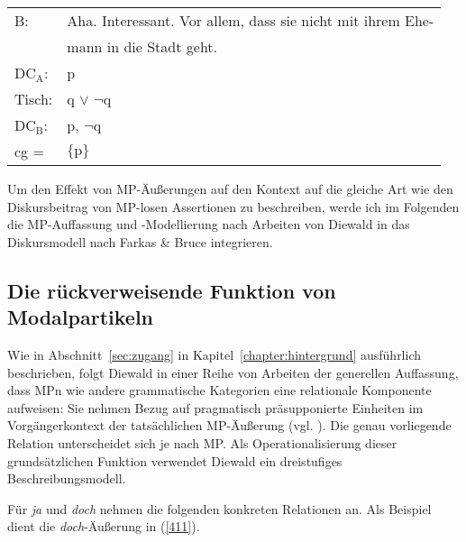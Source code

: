 \begin{exe}
	\ex\label{410}
     \begin{tabular}[t]{lp{20em}}
     		B: & Aha. Interessant. Vor allem, dass sie nicht mit ihrem Ehe-\\
     		& mann in die Stadt geht.\\
            DC$_{\textrm{A}}$: & p\\
            Tisch: & q $\vee$ $\neg$q\\
 			DC$_{\textrm{B}}$: & p, $\neg$q\\
 			cg = & $\lbrace \textrm{p} \rbrace$
      \end{tabular}
\end{exe}	
Um den Effekt von MP-Äußerungen auf den Kontext auf die gleiche Art wie den Diskursbeitrag von MP-losen Assertionen zu be\-schreiben, werde ich im Folgenden die MP-Auffassung und -Modellierung nach Arbeiten von Diewald in das Diskursmodell nach Farkas \& Bruce integrieren.

\subsection{Die rückverweisende Funktion von Modalpartikeln}
\label{sec:mpn}
Wie in Abschnitt~\ref{sec:zugang} in Kapitel~\ref{chapter:hintergrund} ausführlich beschrieben, folgt Diewald in einer Reihe von Arbeiten der generellen Auffassung, dass MPn wie andere grammatische Ka\-tegorien eine relationale Komponente aufweisen: Sie nehmen Bezug auf pragmatisch präsupponierte Einheiten im Vorgängerkontext der tatsächlichen MP-Äußerung (vgl. \citealt[414-415]{Diewald2006}). Die genau vorliegende Relation unterscheidet sich je nach MP. Als Operationalisierung dieser grundsätzlichen Funktion verwendet Diewald ein dreistufiges Beschreibungsmodell. 

Für \textit{ja} und \textit{doch} nehmen \citet{Diewald1998} die folgenden konkreten Relationen an. Als Beispiel dient die \textit{doch}-Äußerung in (\ref{411}).

